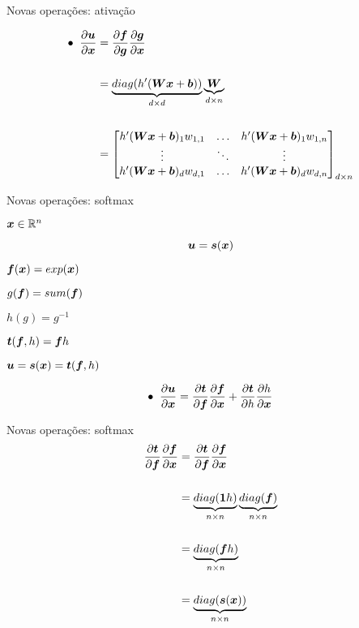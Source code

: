 \documentclass[10pt]{beamer}
\begin{document}
\begin{frame}{Novas operações: ativação}
\large{
\vspace{0.5 cm}

\begin{align*}
\bullet \; \; \frac{\partial \bm{u}}{\partial \bm{x}} &= \frac{\partial \bm{f}}{\partial \bm{g}}\frac{\partial \bm{g}}{\partial \bm{x}}\\
&\\
&= \underbrace{diag(h^{\prime}(\bm{W}\bm{x} + \bm{b}))}_{\tiny{d \times d}} \underbrace{\bm{W}}_{\tiny{d \times n}}\\
&\\
&= \begin{bmatrix}h^{\prime}(\bm{W}\bm{x} + \bm{b})_1 w_{1,1}& \dots & h^{\prime}(\bm{W}\bm{x} + \bm{b})_1 w_{1,n}\\ \vdots & \ddots & \vdots\\ h^{\prime}(\bm{W}\bm{x} + \bm{b})_d w_{d,1}& \dots & h^{\prime}(\bm{W}\bm{x} + \bm{b})_d w_{d,n} \end{bmatrix}_{\tiny{d \times n}}\\
\end{align*}
}
\end{frame}


\begin{frame}{Novas operações: softmax}
\large{
$\bm{x}\in \mathbb{R}^{n}$

\begin{equation*}
\bm{u} = \bm{s}(\bm{x})
\end{equation*}


$\bm{f}(\bm{x}) = exp(\bm{x})$

$g(\bm{f}) = sum(\bm{f})$

$h(g) = g^{-1}$

$\bm{t}(\bm{f},h) = \bm{f}h$

$\bm{u} = \bm{s}(\bm{x}) = \bm{t}(\bm{f},h)$

\begin{align*}
\bullet \;\; \frac{\partial \bm{u}}{\partial \bm{x}} &= \frac{\partial \bm{t}}{\partial \bm{f}}\frac{\partial \bm{f}}{\partial \bm{x}}  + \frac{\partial \bm{t}}{\partial h}\frac{\partial h}{\partial \bm{x}}\\
\end{align*}
}
\end{frame}

\begin{frame}{Novas operações: softmax}
\large{
\begin{align*}
\frac{\partial \bm{t}}{\partial \bm{f}}\frac{\partial \bm{f}}{\partial \bm{x}} & = \frac{\partial \bm{t}}{\partial \bm{f}}\frac{\partial \bm{f}}{\partial \bm{x}}\\
&\\
&= \underbrace{diag(\bm{1}h)}_{\tiny{n \times n}} \underbrace{diag(\bm{f})}_{\tiny{n \times n}}\\
&\\
&= \underbrace{diag(\bm{f}h)}_{\tiny{n \times n}}\\
&\\
&= \underbrace{diag(\bm{s}(\bm{x}))}_{\tiny{n \times n}}\\
\end{align*}
}
\end{frame}
\end{document}
